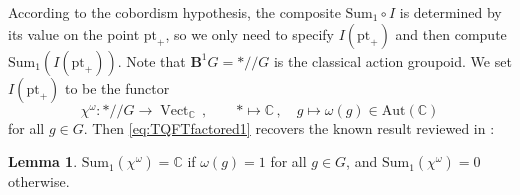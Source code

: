 \documentclass[12pt]{scrartcl}
\newcommand{\boldB}{\boldsymbol{B}}
\newcommand{\C}{\mathds{C}}
\newcommand{\be}{\begin{equation}}
\newcommand{\ee}{\end{equation}}
\def\lra{\longrightarrow}
\def\lmt{\longmapsto}
\newcommand{\Vect}{\operatorname{Vect}}
\theoremstyle{definition}
\newtheorem{lemma}[definition]{Lemma}
\numberwithin{equation}{section}
\numberwithin{definition}{section}
\numberwithin{figure}{section}
\begin{document}
According to the cobordism hypothesis, the composite $\textrm{Sum}_1 \circ I$ is determined by its value on the point $\text{pt}_+$, so we only need to specify $I(\text{pt}_+)$ and then compute $\textrm{Sum}_1(I(\text{pt}_+))$. 
Note that $\boldB^1 G = */\!\!/ G$ is the classical action groupoid. 
We set $I(\text{pt}_+)$ to be the functor
\be
\chi^\omega \colon */\!\!/ G \lra \Vect_\C 
\, , \qquad 
* \lmt \C
\, , \quad 
g \lmt \omega(g) \in \text{Aut}(\C)
\ee
for all $g \in G$. 
Then \eqref{eq:TQFTfactored1} recovers the known result reviewed in \cite[Sect.\,1]{FHLT}: 

\begin{lemma}\label{lemma:cocone-is-coinvariants}
$\text{Sum}_1(\chi^\omega) = \C$ if $\omega(g) = 1$ for all $g\in G$, and $\text{Sum}_1(\chi^\omega) = 0$ otherwise. 
\end{lemma}
\end{document}
